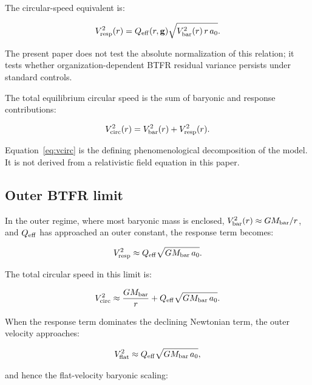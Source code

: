 \documentclass[11pt]{article}
\begin{document}
The circular-speed equivalent is:

\begin{equation}
V_{\rm resp}^{2}(r) = Q_{\rm eff}(r,\mathbf{g}) \sqrt{V_{\rm bar}^{2}(r) \, r \, a_{0}}.
\label{eq:vresp}
\end{equation}

The present paper does not test the absolute normalization of this relation; it tests whether organization-dependent BTFR residual variance persists under standard controls.

The total equilibrium circular speed is the sum of baryonic and response contributions:

\begin{equation}
V_{\rm circ}^{2}(r) = V_{\rm bar}^{2}(r) + V_{\rm resp}^{2}(r).
\label{eq:vcirc}
\end{equation}

Equation~\ref{eq:vcirc} is the defining phenomenological decomposition of the model. It is not derived from a relativistic field equation in this paper.

\subsection{Outer BTFR limit}

In the outer regime, where most baryonic mass is enclosed, $V_{\rm bar}^{2}(r) \approx G M_{\rm bar}/r$, and $Q_{\rm eff}$ has approached an outer constant, the response term becomes:

\begin{equation}
V_{\rm resp}^{2} \approx Q_{\rm eff} \sqrt{G M_{\rm bar} \, a_{0}}.
\label{eq:vresp_outer}
\end{equation}

The total circular speed in this limit is:

\begin{equation}
V_{\rm circ}^{2} \approx \frac{G M_{\rm bar}}{r} + Q_{\rm eff} \sqrt{G M_{\rm bar} \, a_{0}}.
\label{eq:vcirc_outer}
\end{equation}

When the response term dominates the declining Newtonian term, the outer velocity approaches:

\begin{equation}
V_{\rm flat}^{2} \approx Q_{\rm eff} \sqrt{G M_{\rm bar} \, a_{0}},
\label{eq:vflat_intermediate}
\end{equation}

and hence the flat-velocity baryonic scaling:
\end{document}
